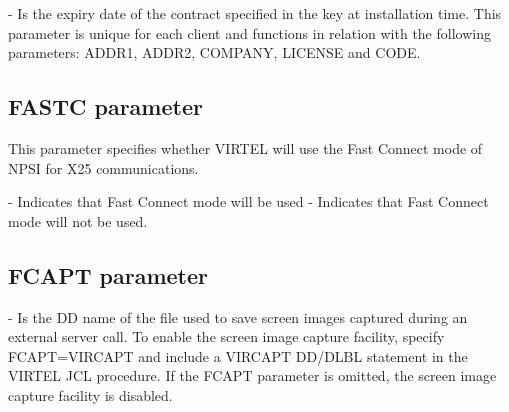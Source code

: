 \documentclass[letterpaper,10pt,english]{sphinxmanual}
\begin{document}
 - Is the expiry date of the contract specified in the key at installation time. This parameter is unique for each client and functions in relation with the following parameters: ADDR1, ADDR2, COMPANY, LICENSE and CODE.

\ignorespaces 

\subsection{FASTC parameter}
\label{\detokenize{Installation_Guide:fastc-parameter}}\label{\detokenize{Installation_Guide:index-64}}
\begin{sphinxVerbatim}[commandchars=\\\{\}]
 
\end{sphinxVerbatim}

This parameter specifies whether VIRTEL will use the Fast Connect mode of NPSI for X25 communications.

 - Indicates that Fast Connect mode will be used
 - Indicates that Fast Connect mode will not be used.

\ignorespaces 

\subsection{FCAPT parameter}
\label{\detokenize{Installation_Guide:fcapt-parameter}}\label{\detokenize{Installation_Guide:index-65}}
\begin{sphinxVerbatim}[commandchars=\\\{\}]
  
\end{sphinxVerbatim}

 - Is the DD name of the file used to save screen images captured during an external server call. To enable the screen image capture facility, specify FCAPT=VIRCAPT and include a VIRCAPT DD/DLBL statement in the VIRTEL JCL procedure. If the FCAPT parameter is omitted, the screen image capture facility is disabled.
\end{document}
